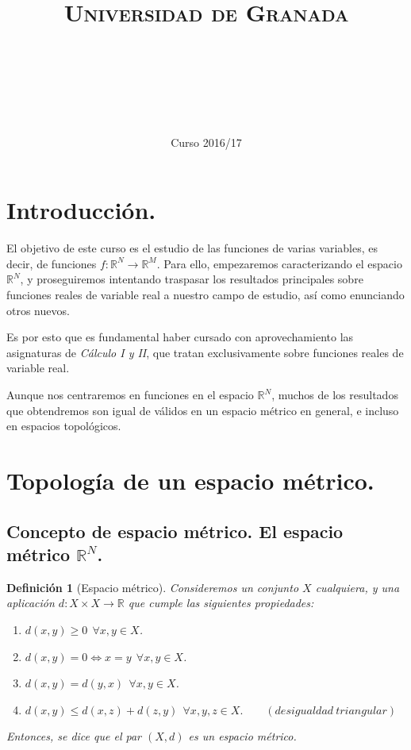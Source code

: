 \documentclass[11pt, a4paper, titlepage]{article}
\title{
  \normalfont \normalsize 
  \textsc{Universidad de Granada} \\ [25pt]    %
  \horrule{0.5pt} \\[0.4cm] %
  \huge \subject\\ %
  \horrule{2pt} \\[0.5cm] %
}
\author{\Large{\docauthor}}
\date{\vspace{-1.5em} \normalsize Curso 2016/17}
\theoremstyle{theorem-style}
\theoremstyle{definition-style}
\newtheorem*{ndef}{Definición}
\theoremstyle{remark-style}
\theoremstyle{example-style}
\newenvironment{nlist}
{\begin{enumerate}
\renewcommand\labelenumi{(\emph{\roman{enumi})}}}
{\end{enumerate}}
\begin{document}
\maketitle  %
\tableofcontents    %
\newpage



\section*{Introducción.}

El objetivo de este curso es el estudio de las funciones de varias variables, es decir, de funciones $f: \mathbb{R}^N \longrightarrow \mathbb{R}^M$. Para ello, empezaremos caracterizando el espacio $\mathbb{R}^N$, y proseguiremos intentando traspasar los resultados principales sobre funciones reales de variable real a nuestro campo de estudio, así como enunciando otros nuevos.

Es por esto que es fundamental haber cursado con aprovechamiento las asignaturas de \emph{Cálculo I y II}, que tratan exclusivamente sobre funciones reales de variable real.

Aunque nos centraremos en funciones en el espacio $\mathbb{R}^N$, muchos de los resultados que obtendremos son igual de válidos en un espacio métrico en general, e incluso en espacios topológicos.

\newpage


\section{Topología de un espacio métrico.}

\subsection{Concepto de espacio métrico. El espacio métrico $\mathbb{R}^N$.}

\begin{ndef}[Espacio métrico]
Consideremos un conjunto $X$ cualquiera, y una aplicación \mbox{$d:X\times X \longrightarrow \mathbb{R}$} que cumple las siguientes propiedades:

\begin{nlist}
\item $d(x,y) \ge 0\ \ \forall x,y \in X$.

\item $d(x,y) = 0 \iff x = y\ \ \forall x,y \in X$.

\item $d(x,y) = d(y,x)\ \ \forall x,y \in X$.

\item $d(x,y) \leq d(x,z) + d(z,y)\ \ \forall x,y,z \in X. \quad \quad(desigualdad\ triangular)$

\end{nlist}

Entonces, se dice que el par $(X,d)$ es un \emph{espacio métrico}.
\end{ndef}
\end{document}
